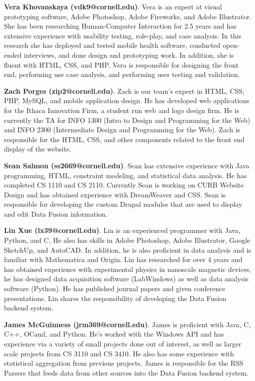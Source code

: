 \documentclass[11pt]{article} %
\begin{document}
\textbf{Vera Khovanskaya (vdk9@cornell.edu)}. Vera is an expert at visual prototyping software, Adobe Photoshop, Adobe Fireworks, and Adobe Illustrator. She has been researching Human-Computer Interaction for 2.5 years and has extensive experience with usability testing, role-play, and case analysis. In this research she has deployed and tested mobile health software, conducted open-ended interviews, and done design and prototyping work. In addition, she is fluent with HTML, CSS, and PHP. Vera is responsible for designing the front end, performing use case analysis, and performing user testing and validation. 

\textbf{Zach Porges (zip2@cornell.edu)}. Zach is our team’s expert in HTML, CSS, PHP, MySQL, and mobile application design. He has developed web applications for the Ithaca Innovation Firm, a student run web and logo design firm. He is currently the TA for INFO 1300 (Intro to Design and Programming for the Web) and INFO 2300 (Intermediate Design and Programming for the Web). Zach is responsible for the HTML, CSS, and other components related to the front end display of the website.

\textbf{Sean Salmon (ss2669@cornell.edu)}. Sean has extensive experience with Java programming, HTML, constraint modeling, and statistical data analysis. He has completed CS 1110 and CS 2110. Currently Sean is working on CURB Website Design and has obtained experience with DreamWeaver and CSS. Sean is responsible for developing the custom Drupal modules that are used to display and edit Data Fusion information.

\textbf{Lin Xue (lx39@cornell.edu)}. Lin is an experienced programmer with Java, Python, and C. He also has skills in Adobe Photoshop, Adobe Illustrator, Google SketchUp, and AutoCAD. In addition, he is also proficient in data analysis and is familiar with Mathematica and Origin. Lin has researched for over 4 years and has obtained experience with experimental physics in nanoscale magnetic devices, he has designed data acquisition software (LabWindows) as well as data analysis software (Python). He has published journal papers and given conference presentations. Lin shares the responsibility of developing the Data Fusion backend system.

\textbf{James McGuinness (jrm369@cornell.edu)}. James is proficient with Java, C, C++, OCaml, and Python. He’s worked with the Windows API and has experience via a variety of small projects done out of interest, as well as larger scale projects from CS 3110 and CS 3410. He also has some experience with statistical aggregation from previous projects. James is responsible for the RSS Parsers that feeds data from other sources into the Data Fusion backend system.
\end{document}
